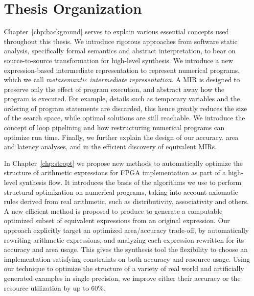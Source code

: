 \section{Thesis Organization}

Chapter~\ref{chp:background} serves to explain various essential concepts used
throughout this thesis.  We introduce rigorous approaches from software static
analysis, specifically formal semantics and abstract interpretation, to bear
on source-to-source transformation for high-level synthesis.  We introduce
a new expression-based intermediate representation to represent numerical
programs, which we call \emph{metasemantic intermediate representation}.  A
MIR is designed to preserve only the effect of program execution, and abstract
away how the program is executed.  For example, details such as temporary
variables and the ordering of program statements are discarded, this hence
greatly reduces the size of the search space, while optimal solutions are still
reachable.  We introduce the concept of loop pipelining and how restructuring
numerical programs can optimize run time.  Finally, we further explain the
design of our accuracy, area and latency analyses, and in the efficient
discovery of equivalent MIRs.

In Chapter~\ref{chp:stropt} we propose new methods to automatically optimize
the structure of arithmetic expressions for FPGA implementation as part of
a high-level synthesis flow.  It introduces the basis of the algorithms we
use to perform structural optimization on numerical programs, taking into
account axiomatic rules derived from real arithmetic, such as distributivity,
associativity and others.  A new efficient method is proposed to produce to
generate a computable optimized subset of equivalent expressions from an
original expression.  Our approach explicitly target an optimized area/accuracy
trade-off, by automatically rewriting arithmetic expressions, and analyzing
each expression rewritten for its accuracy and area usage.  This gives
the synthesis tool the flexibility to choose an implementation satisfying
constraints on both accuracy and resource usage.  Using our technique to
optimize the structure of a variety of real world and artificially generated
examples in single precision, we improve either their accuracy or the resource
utilization by up to 60\%.

